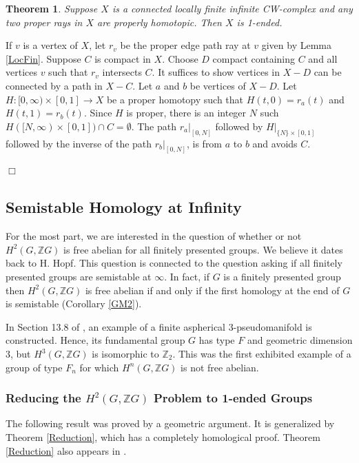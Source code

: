\documentclass[12pt]{article}
\newtheorem{theorem}{Theorem}[subsection]
\newenvironment{proof}{\addvspace{12pt}\noindent{\bf Proof:}}{
$\Box$\par\addvspace{12pt}}
\begin{document}
\begin{theorem} \label{SSto1E} 
Suppose $X$ is a connected locally finite infinite CW-complex and any two proper rays in $X$ are properly homotopic. Then $X$ is 1-ended.
\end{theorem}
\begin{proof} 
If $v$ is a vertex of $X$, let $r_v$ be the proper edge path ray at $v$ given by Lemma \ref{LocFin}. Suppose $C$ is compact in $X$. Choose $D$ compact containing $C$ and all vertices $v$ such that $r_v$ intersects $C$. It suffices to show vertices in $X-D$ can be connected by a path in $X-C$. Let $a$ and $b$ be vertices of $X-D$. Let $H:[0,\infty)\times [0,1]\to X$ be a proper homotopy such that $H(t,0)=r_a(t)$ and $H(t,1)=r_b(t)$. Since $H$ is proper, there is an integer $N$ such $H([N,\infty)\times [0,1])\cap C=\emptyset$. The path  $r_a|_{[0,N]}$ followed by $H|_{\{N\}\times[0,1]}$ followed by the inverse of the path $r_b|_{[0,N]}$, is from $a$ to $b$ and avoids $C$. 
\end{proof}


\newpage
\subsection{Semistable Homology at Infinity}\label{SSHom}

For the most part, we are interested in the question of whether or not $H^2(G,\mathbb ZG)$ is free abelian for all finitely presented groups.  We believe it dates back to H. Hopf. This question is connected to the question asking if all finitely presented groups are semistable at $\infty$. In fact, if $G$ is a finitely presented group then $H^2(G,\mathbb ZG)$ is free abelian if and only if the first homology at the end of $G$ is semistable (Corollary \ref{GM2}). 

In Section 13.8 of \cite{G}, an example of a finite aspherical 3-pseudomanifold is constructed. Hence, its fundamental group $G$ has type $F$ and geometric dimension 3, but $H^3(G,\mathbb ZG)$ is isomorphic to $\mathbb Z_2$. This was the first exhibited example of a group of type $F_n$ for which $H^n(G,\mathbb ZG)$ is not free abelian. 


\subsubsection{Reducing the $H^2(G,\mathbb ZG)$ Problem to 1-ended Groups} \label{RedH2-1} 

The following result was proved by a geometric argument. It is generalized by Theorem \ref{Reduction}, which has a completely homological proof. Theorem \ref{Reduction} also appears in \cite{MS19}.
\end{document}
